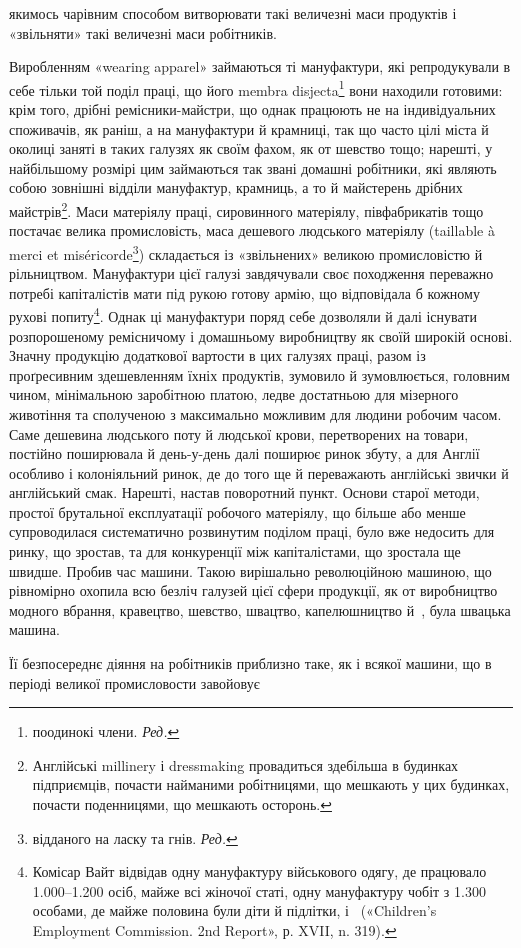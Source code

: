 \parcont{}  %
якимось чарівним способом витворювати такі величезні маси продуктів
і «звільняти» такі величезні маси робітників.

Виробленням «wearing apparel» займаються ті мануфактури,
які репродукували в себе тільки той поділ праці, що його membra
disjecta\footnote*{
поодинокі члени. \emph{Ред.}
} вони находили готовими: крім того, дрібні ремісники-майстри,
що однак працюють не на індивідуальних споживачів,
як раніш, а на мануфактури й крамниці, так що часто цілі міста
й околиці заняті в таких галузях як своїм фахом, як от шевство
тощо; нарешті, у найбільшому розмірі цим займаються так звані
домашні робітники, які являють собою зовнішні відділи мануфактур,
крамниць, а то й майстерень дрібних майстрів\footnote{
Англійські millinery і dressmaking провадиться здебільша в
будинках підприємців, почасти найманими робітницями, що мешкають
у цих будинках, почасти поденницями, що мешкають осторонь.
}. Маси матеріялу праці, сировинного матеріялу, півфабрикатів тощо
постачає велика промисловість, маса дешевого людського матеріялу
(taillable à merci et miséricorde\footnote*{
відданого на ласку та гнів. \emph{Ред.}
}) складається із «звільнених»
великою промисловістю й рільництвом. Мануфактури
цієї галузі завдячували своє походження переважно потребі капіталістів
мати під рукою готову армію, що відповідала б кожному
рухові попиту\footnote{
Комісар Вайт відвідав одну мануфактуру військового одягу,
де працювало \num{1.000}--\num{1.200} осіб, майже всі жіночої статі, одну мануфактуру
чобіт з \num{1.300} особами, де майже половина були діти й підлітки, і~ («Children’s Employment Commission. 2nd Report», р. XVII,
n. 319).
}. Однак ці мануфактури поряд себе дозволяли й далі
існувати розпорошеному ремісничому і домашньому виробництву
як своїй широкій основі. Значну продукцію додаткової вартости
в цих галузях праці, разом із проґресивним здешевленням їхніх
продуктів, зумовило й зумовлюється, головним чином, мінімальною
заробітною платою, ледве достатньою для мізерного животіння
та сполученою з максимально можливим для людини робочим
часом. Саме дешевина людського поту й людської крови, перетворених
на товари, постійно поширювала й день-у-день далі поширює
ринок збуту, а для Англії особливо і колоніяльний ринок, де
до того ще й переважають англійські звички й англійський смак.
Нарешті, настав поворотний пункт. Основи старої методи, простої
брутальної експлуатації робочого матеріялу, що більше або
менше супроводилася систематично розвинутим поділом праці,
було вже недосить для ринку, що зростав, та для конкуренції
між капіталістами, що зростала ще швидше. Пробив час машини.
Такою вирішально революційною машиною, що рівномірно охопила
всю безліч галузей цієї сфери продукції, як от виробництво
модного вбрання, кравецтво, шевство, швацтво, капелюшництво
й~, була швацька машина.

Її безпосереднє діяння на робітників приблизно таке, як і
всякої машини, що в періоді великої промисловости завойовує
\parbreak{}  %
